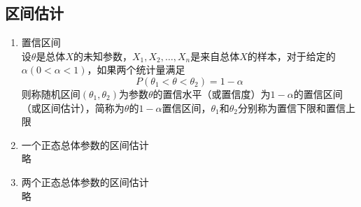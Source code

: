 \subsection{区间估计}
\begin{enumerate}
	\item 置信区间 \\
	设$\theta$是总体$X$的未知参数，$X_1, X_2, \dots, X_n$是来自总体$X$的样本，对于给定的$\alpha(0<\alpha<1)$，如果两个统计量满足
	\begin{equation}
		P(\theta_1<\theta<\theta_2) = 1-\alpha
	\end{equation}
	则称随机区间$(\theta_1, \theta_2)$为参数$\theta$的置信水平（或置信度）为$1-\alpha$的置信区间（或区间估计），简称为$\theta$的$1-\alpha$置信区间，$\theta_1$和$\theta_2$分别称为置信下限和置信上限
	\item 一个正态总体参数的区间估计 \\
	略
	\item 两个正态总体参数的区间估计 \\
	略
\end{enumerate}
















